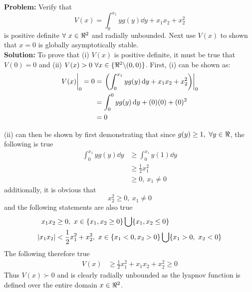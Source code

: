 \documentclass[letter]{article}
\begin{document}
\noindent
\textbf{Problem:}
Verify that
\begin{equation}
	V(x) = \int_0^{x_1} y g(y) \dd{y} + x_1 x_2 + x_2^2
\end{equation}
is positive  definite $\forall \ x \in \real^2$ and radially unbounded. Next use $V(x)$ to shown that $x=0$ is globally asymptotically stable.\\

\noindent
\textbf{Solution:}
To prove that (i) $V(x)$ is positive definite, it must be true that $V(0) = 0$ and (ii) $V(x) > 0 \ \forall x \in \{ \real^2 \backslash (0,0)\}$. First, (i) can be shown as:
\begin{align}
	\eval{V(x)}_0 = 0
	&= \eval{\qty(\int_0^{x_1} y g(y) \dd{y} + x_1 x_2 + x_2^2)}_0\\
	&= \int_0^{0} y g(y) \dd{y} + (0)(0) + (0)^2\\
	&= 0
\end{align}

(ii) can then be shown by first demonstrating that since $g(y) \geq 1, \ \forall y \in \real$, the following is true
\begin{align}
	\int_0^{x_1} y g(y) \dd{y}
	&\geq \int_0^{x_1} y (1) \dd{y}\\
	&\geq \frac{1}{2} x_1^2\\
	&\geq 0, \ x_1 \neq 0
\end{align}
additionally, it is obvious that $$x_2^2 \geq 0, \ x_1 \neq 0$$
and the following statements are also true
\begin{align}
	x_1 x_2 &\geq 0, \ x \in \{x_1, x_2 \geq 0\} \bigcup \{x_1, x_2 \leq 0\}\\
	\abs{x_1 x_2} &< \frac{1}{2} x_1^2 + x_2^2, \ x \in \{x_1 < 0, x_2 > 0\} \bigcup \{x_1 > 0, \ x_2 < 0\}
\end{align}
The following therefore true
\begin{align}
	V(x) &\geq \frac{1}{2} x_1^2 + x_1 x_2 + x_2^2 \geq 0
\end{align}
Thus $V(x) \succ 0$ and is clearly radially unbounded as the lyapnov function is defined over the entire domain $x \in \real^2$.
\end{document}
